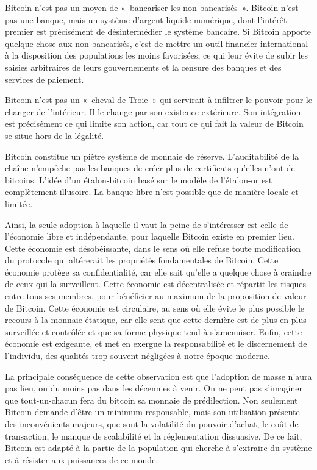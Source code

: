 Bitcoin n'est pas un moyen de «~bancariser les non-bancarisés~». Bitcoin n'est pas une banque, mais un système d'argent liquide numérique, dont l'intérêt premier est précisément de désintermédier le système bancaire. Si Bitcoin apporte quelque chose aux non-bancarisés, c'est de mettre un outil financier international à la disposition des populations les moins favorisées, ce qui leur évite de subir les saisies arbitraires de leurs gouvernements et la censure des banques et des services de paiement.

Bitcoin n'est pas un «~cheval de Troie~» qui servirait à infiltrer le pouvoir pour le changer de l'intérieur. Il le change par son existence extérieure. Son intégration est précisément ce qui limite son action, car tout ce qui fait la valeur de Bitcoin se situe hors de la légalité.

Bitcoin constitue un piètre système de monnaie de réserve. L'auditabilité de la chaîne n'empêche pas les banques de créer plus de certificats qu'elles n'ont de bitcoins. L'idée d'un étalon-bitcoin basé sur le modèle de l'étalon-or est complètement illusoire. La banque libre n'est possible que de manière locale et limitée.

Ainsi, la seule adoption à laquelle il vaut la peine de s'intéresser est celle de l'économie libre et indépendante, pour laquelle Bitcoin existe en premier lieu. Cette économie est désobéissante, dans le sens où elle refuse toute modification du protocole qui altérerait les propriétés fondamentales de Bitcoin. Cette économie protège sa confidentialité, car elle sait qu'elle a quelque chose à craindre de ceux qui la surveillent. Cette économie est décentralisée et répartit les risques entre tous ses membres, pour bénéficier au maximum de la proposition de valeur de Bitcoin. Cette économie est circulaire, au sens où elle évite le plus possible le recours à la monnaie étatique, car elle sent que cette dernière est de plus en plus surveillée et contrôlée et que sa forme physique tend à s'amenuiser. Enfin, cette économie est exigeante, et met en exergue la responsabilité et le discernement de l'individu, des qualités trop souvent négligées à notre époque moderne.

La principale conséquence de cette observation est que l'adoption de masse n'aura pas lieu, ou du moins pas dans les décennies à venir. On ne peut pas s'imaginer que tout-un-chacun fera du bitcoin sa monnaie de prédilection. Non seulement Bitcoin demande d'être un minimum responsable, mais son utilisation présente des inconvénients majeurs, que sont la volatilité du pouvoir d'achat, le coût de transaction, le manque de scalabilité et la réglementation dissuasive. De ce fait, Bitcoin est adapté à la partie de la population qui cherche à s'extraire du système et à résister aux puissances de ce monde.

